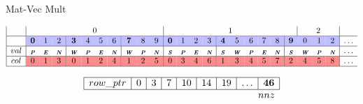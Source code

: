 \documentclass[handout]{beamer}
\newcommand{\blue}{\cellcolor{blue!25}}  %
\newcommand{\red}{\cellcolor{red!45}}  %
\newcommand{\mbiu}[1]{_{\textbf{\em #1}}}
\begin{document}
\begin{frame}{Mat-Vec Mult}
\begin{tiny}
\begin{equation*}
\begin{array}{|c|ccc|cccc|ccc|cccc|ccccc|cccc|c}
    & \multicolumn{10}{c|}{0} & \multicolumn{10}{c|}{1} & \multicolumn{3}{c|}{2} \\ 
\hline
    & \blue \mathbf{0} & \blue 1 & \blue 2 & \blue \mathbf{3} & \blue 4 & \blue 5 & \blue 6 & \blue \mathbf{7} & \blue 8 & \blue 9 & \blue \mathbf{0} & \blue 1 & \blue 2 & \blue 3 & \blue \mathbf{4} & \blue 5 & \blue 6 & \blue 7 & \blue 8 & \blue \mathbf{9} & \blue 0 & \blue 1 & \blue 2 & \dots \\
\hline
val & \mbiu{P} & \mbiu{E} & \mbiu{N} & \mbiu{W} & \mbiu{P} & \mbiu{E} & \mbiu{N} & \mbiu{W} & \mbiu{P} & \mbiu{N} &
\mbiu{S} & \mbiu{P} & \mbiu{E} & \mbiu{N} & \mbiu{S} & \mbiu{W} & \mbiu{P} & \mbiu{E} & \mbiu{N} & \mbiu{S} & \mbiu{W} & \mbiu{P} & \mbiu{N} & \dots \\
\hline
col & \red 0 & \red 1 & \red 3 & \red 0 & \red 1 & \red 2 & \red 4 & \red 1 & \red 2 & \red 5 & \red 0 & \red 3 & \red 4 & \red 6 & \red 1 & \red 3 & \red 4 & \red 5 & \red 7 & \red 2 & \red 4 & \red 5 & \red 8 & \dots \\
\hline
\end{array}
\end{equation*}

\begin{equation*}
\begin{array}{|c|c|c|c|c|c|c|c|c|}
\hline
row\_ptr & 0 & 3 & 7 & 10 & 14 & 19 & \dots & \mathbf{46} \\
\hline
 \multicolumn{9}{r}{nnz} \\
\end{array}
\end{equation*}

\end{tiny}


\end{frame}
\end{document}
